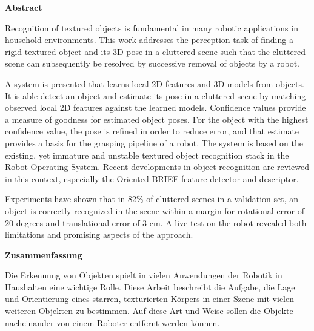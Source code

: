 

\clearemptydoublepage
{}
{}	

\vspace*{2cm}
\begin{center}
{\Large \bf Abstract}
\end{center}
\vspace{1cm}

Recognition of textured objects is fundamental in many robotic applications in
household environments. This work addresses the perception task of finding a
rigid textured object and its 3D pose in a cluttered scene such that the
cluttered scene can subsequently be resolved by successive removal of objects
by a robot.

A system is presented that learns local 2D features and 3D models from objects.
It is able detect an object and estimate its pose in a cluttered scene by
matching observed local 2D features against the learned models.  Confidence
values provide a measure of goodness for estimated object poses. For the object
with the highest confidence value, the pose is refined in order to reduce
error, and that estimate provides a basis for the grasping pipeline of a robot.
The system is based on the existing, yet immature and unstable textured object
recognition stack in the Robot Operating System. Recent developments in object
recognition are reviewed in this context, especially the Oriented BRIEF feature
detector and descriptor.

Experiments have shown that in 82\% of cluttered scenes in a validation set, an
object is correctly recognized in the scene within a margin for rotational
error of 20 degrees and translational error of 3 cm.  A live test on the robot
revealed both limitations and promising aspects of the approach.

\clearemptydoublepage
{}
{}

\vspace*{2cm}
\begin{center}
{\Large \bf Zusammenfassung}
\end{center}
\vspace{1cm}


Die Erkennung von Objekten spielt in vielen Anwendungen der Robotik in
Haushalten eine wichtige Rolle. Diese Arbeit beschreibt die Aufgabe, die Lage
und Orientierung eines starren, texturierten Körpers in einer Szene mit vielen
weiteren Objekten zu bestimmen. Auf diese Art und Weise sollen die Objekte
nacheinander von einem Roboter entfernt werden können.

